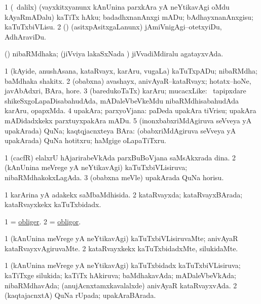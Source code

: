 \bentry
{}
\gl{\sakirx}
\bmng
\bnum
\num{1} (\sA\ \kaparx dalilx) (vayxkitxyanunx kAnUnina parxkAra yA neYtikavAgi oMdu kAyaRmADalu) kaTiTx hAku; badadhxnanAnxgi mADu; bAdhayxnanAnxgisu; kaTuTxbiVLisu. 
\num{2} (\ame) (asitxpAsitxgaLanunx) jAmiVnigAgi--otetxyiDu, AdhAraviDu. 
\enum
\emng
\eentry

\bentry
{}
\gl{\gu}
\bmng
(\jiVvi) nibaRMdhaka; (jiVviya lakaSxNada \vi) jiVvadiMdiralu agatayxvAda. 
\emng
\eentry

\bentry
{}
\gl{\nA}
\bmng
% 
\bnum
\num{1} (kAyide, anushAsana, kataRvayx, karAru, \mo vugaLa) kaTuTxpADu; nibaRMdha; baMdhaka shakitx. 
\num{2} (obabxna) avashayx, anivAyaR--kataRvayx; hotatx--hoNe, javAbAdxri, BAra, hore. 
\num{3} (baredukoTaTx) karAru; mucacxLike: \kanmu\ tapipxdare shikeSxgoLapaDisabahudAda, mADaleVbeVkeMdu nibaRMdhisabahudAda karAru, opapxMda. 
\num{4} upakAra; parxyoVjana:  paDeda upakAra tiVrisu; upakAra mADidadxkekx parxtuyxpakAra mADu. 
\num{5} (inonxbabxriMdAgiruva seVveya yA upakArada) QuNa; kaqtqjacnxteya BAra:  (obabxriMdAgiruva seVveya yA upakArada) QuNa hotitxru; haMgige oLapaTiTxru. 
\enum
\emng

\noindent
\gl{\pagu}
\bmng
\bnum
\num{1}  (cacfR) elalxrU hAjarirabeVkAda parxBuBoVjana saMsAkxrada dina. 
\num{2}  (kAnUnina meVrege yA neYtikavAgi) kaTuTxbiVLisiruva; nibaRMdhakokxLagAda. 
\num{3}  (obabxna meVle) upakArada QuNa horisu. 
\enum
\emng
\eentry

\bentry
{}
\gl{\gu}
\bmng
\bnum
\num{1} karArina yA adakekx saMbaMdhisida. 
\num{2} kataRvayxda; kataRvayxBArada; kataRvayxkekx kaTuTxbidadx. 
\enum
\emng
\eentry

\bentry
{}
\gl{\nA}
\bmng
% 
\bnum
\num{1} = \hyperlink{obliger}{obliger}. 
\num{2} = \hyperlink{obligor}{obligor}. 
\enum
\emng
\eentry

\bentry
{}
\gl{\kirxvi}
\bmng
\bnum
\num{1} (kAnUnina meVrege yA neYtikavAgi) kaTuTxbiVLisiruvaMte; anivAyaR kataRvayxvAgiruvaMte. 
\num{2} kataRvayxkekx kaTuTxbidadxMte, silukidaMte. 
\enum
\emng
\eentry

\bentry
{}
\gl{\gu}
\bmng
\bnum
\num{1} (kAnUnina meVrege yA neYtikavAgi) kaTuTxbidadx kaTuTxbiVLisiruva; kaTiTxge silukida; kaTiTx hAkiruva; baMdhakavAda; mADaleVbeVkAda; nibaRMdhavAda; (anujAcnxtamxkavalalxde) anivAyaR kataRvayxvAda. 
\num{2} (kaqtajacnxtA) QuNa rUpada; upakAraBArada. 
\enum
\emng
\eentry

